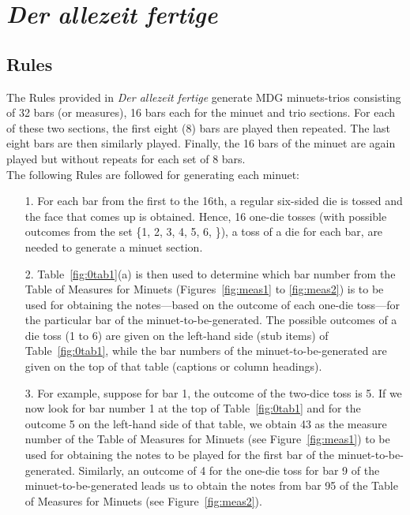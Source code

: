 \documentclass[a4paper,x11names,svgnames,10pt]{article}
\begin{document}
\section{\em Der allezeit fertige}

\subsection{Rules}

The Rules provided in {\it Der allezeit fertige} generate MDG minuets-trios consisting of 32 bars (or measures), 16 bars each for the minuet and trio sections.  For each of these two sections, the first eight (8) bars are played then repeated.  The last eight bars are then similarly played. Finally, the 16 bars of the minuet are again played but without repeats for each set of 8 bars. \\

The following Rules are followed for generating each minuet:
\begin{enumerate}
	\item [1.] For each bar from the first to the 16th, a regular six-sided die is tossed and the face that comes up is obtained.  Hence, 16 one-die tosses (with possible outcomes from the set \{1, 2, 3, 4, 5, 6, \}), a toss of a die for each bar, are needed to generate a minuet section.   
	\item [2.] Table~\ref{fig:0tab1}(a) is then used to determine which bar number from the Table of Measures for Minuets (Figures~\ref{fig:meas1} to \ref{fig:meas2}) is to be used for obtaining the notes---based on the outcome of each one-die toss---for the particular bar of the minuet-to-be-generated.  The possible outcomes of a die toss (1 to 6) are given on the left-hand side (stub items) of Table~\ref{fig:0tab1}, while the bar numbers of the minuet-to-be-generated are given on the top of that table (captions or column  headings).
	\item [3.]  For example, suppose for bar 1, the outcome of the two-dice toss is 5.  If we now look for bar number 1 at the top of Table~\ref{fig:0tab1} and for the outcome 5 on the left-hand side of that table, we obtain 43 as the measure number of the Table of Measures for Minuets (see Figure~\ref{fig:meas1}) to be used for obtaining the notes to be played for the first bar of the minuet-to-be-generated.  Similarly, an outcome of 4 for the one-die toss for bar 9 of the minuet-to-be-generated leads us to obtain the notes from bar 95 of the Table of Measures for Minuets (see Figure~\ref{fig:meas2}).
\end{enumerate}   
\end{document}

